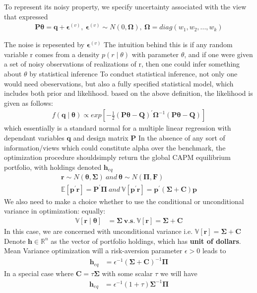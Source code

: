 \documentclass[12pt]{article}
\numberwithin{equation}{section}
\begin{document}
To represent its noisy property, we specify uncertainty associated with the view that expressed
\begin{align} 
\textbf{P} \boldsymbol{\theta} = \textbf{q} + \boldsymbol{\epsilon}^{(v)},\ \boldsymbol{\epsilon}^{(v)} \sim N(0, \boldsymbol{\Omega}) , \ \boldsymbol{\Omega} = diag(w_1, w_2, ..., w_k)
\end{align}

The noise is repesented by $\boldsymbol{\epsilon}^{(v)}$
The intuition behind this is if any random variable r comes from a density $p(r \mid \theta)$ with parameter $\theta$, and if one were given a set of noisy observations of realizations of r, then one could infer something about $\theta$ by statistical inference
To conduct statistical inference, not only one would need obeservations, but also a fully specified statistical model, which includes both prior and likelihood. 
based on the above definition, the likelihood is given as follows:
\begin{align} 
f(\textbf{q} \mid \boldsymbol{\theta}) \propto  exp[-\frac{1}{2}(\textbf{P}\boldsymbol{\theta}-\textbf{Q})^{'}\boldsymbol{\Omega}^{-1}(\textbf{P}\boldsymbol{\theta}-\textbf{Q})]
\end{align}
which essentially is a standard normal for a multiple linear regression with dependant variables $\textbf{q}$ and design matrix $\textbf{P}$
In the absence of any sort of information/views which could constitute alpha over the benchmark, the optimization procedure shouldsimply return the global CAPM equilibrium portfolio, with holdings denoted $\textbf{h}_{eq}$
\begin{align}
\textbf{r} \sim N(\boldsymbol{\theta}, \boldsymbol{\Sigma}) \ and \ \boldsymbol{\theta} \sim N(\boldsymbol{\Pi}, \textbf{F}) \\
\mathbb{E}[\textbf{p}^{'}\textbf{r}] = \textbf{P}^{'}\boldsymbol{\Pi} \ and \ \mathbb{V}[\textbf{p}^{'}\textbf{r}] = \textbf{p}^{'}(\boldsymbol{\Sigma}+ \textbf{C})\textbf{p}
\end{align}
We also need to make a choice whether to use the conditional or unconditional variance in optimization: 
equally:
\begin{align}
\mathbb{V}[\textbf{r}\mid\boldsymbol{\theta}] &= \boldsymbol{\Sigma} \ \textbf{v.s.} \ \mathbb{V}[\textbf{r}] = \boldsymbol{\Sigma} + \textbf{C}
\end{align}
In this case, we are concerned with unconditional variance i.e.  $\mathbb{V}[\textbf{r}] = \boldsymbol{\Sigma} + \textbf{C}$
Denote $\textbf{h} \in \mathbb{R}^{n}$ as the vector of portfolio holdings, which has \textbf{unit of dollars}. Mean Variance optimization will a risk-aversion parameter $\epsilon > 0$ leads to
\begin{align}
\textbf{h}_{eq} &= \epsilon^{-1}(\boldsymbol{\Sigma}+\textbf{C})^{-1}\boldsymbol{\Pi}
\end{align}
In a special case where $\textbf{C} = \tau \boldsymbol{\Sigma}$ with some scalar $\tau$ we will have 
\begin{align}
\textbf{h}_{eq} &= \epsilon^{-1}(1+\tau)\boldsymbol{\Sigma}^{-1}\boldsymbol{\Pi}
\end{align}
\end{document}
